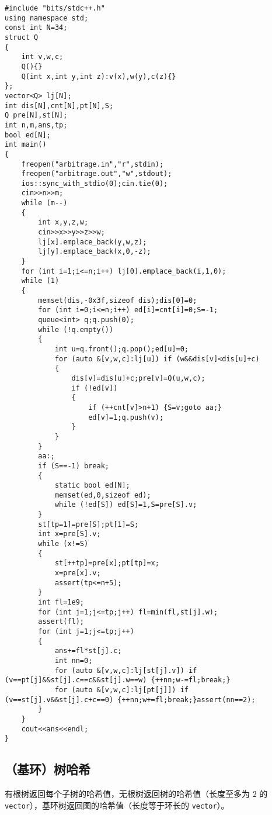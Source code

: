 \documentclass[12pt]{ctexart}
\begin{document}
\begin{lstlisting}
#include "bits/stdc++.h"
using namespace std;
const int N=34;
struct Q
{
	int v,w,c;
	Q(){}
	Q(int x,int y,int z):v(x),w(y),c(z){}
};
vector<Q> lj[N];
int dis[N],cnt[N],pt[N],S;
Q pre[N],st[N];
int n,m,ans,tp;
bool ed[N];
int main()
{
	freopen("arbitrage.in","r",stdin);
	freopen("arbitrage.out","w",stdout);
	ios::sync_with_stdio(0);cin.tie(0);
	cin>>n>>m;
	while (m--)
	{
		int x,y,z,w;
		cin>>x>>y>>z>>w;
		lj[x].emplace_back(y,w,z);
		lj[y].emplace_back(x,0,-z);
	}
	for (int i=1;i<=n;i++) lj[0].emplace_back(i,1,0);
	while (1)
	{
		memset(dis,-0x3f,sizeof dis);dis[0]=0;
		for (int i=0;i<=n;i++) ed[i]=cnt[i]=0;S=-1;
		queue<int> q;q.push(0);
		while (!q.empty())
		{
			int u=q.front();q.pop();ed[u]=0;
			for (auto &[v,w,c]:lj[u]) if (w&&dis[v]<dis[u]+c)
			{
				dis[v]=dis[u]+c;pre[v]=Q(u,w,c);
				if (!ed[v])
				{
					if (++cnt[v]>n+1) {S=v;goto aa;}
					ed[v]=1;q.push(v);
				}
			}
		}
		aa:;
		if (S==-1) break;
		{
			static bool ed[N];
			memset(ed,0,sizeof ed);
			while (!ed[S]) ed[S]=1,S=pre[S].v;
		}
		st[tp=1]=pre[S];pt[1]=S;
		int x=pre[S].v;
		while (x!=S)
		{
			st[++tp]=pre[x];pt[tp]=x;
			x=pre[x].v;
			assert(tp<=n+5);
		}
		int fl=1e9;
		for (int j=1;j<=tp;j++) fl=min(fl,st[j].w);
		assert(fl);
		for (int j=1;j<=tp;j++)
		{
			ans+=fl*st[j].c;
			int nn=0;
			for (auto &[v,w,c]:lj[st[j].v]) if (v==pt[j]&&st[j].c==c&&st[j].w==w) {++nn;w-=fl;break;}
			for (auto &[v,w,c]:lj[pt[j]]) if (v==st[j].v&&st[j].c+c==0) {++nn;w+=fl;break;}assert(nn==2);
		}
	}
	cout<<ans<<endl;
}
\end{lstlisting}

\subsection{（基环）树哈希}

有根树返回每个子树的哈希值，无根树返回树的哈希值（长度至多为 $2$ 的 \verb|vector|），基环树返回图的哈希值（长度等于环长的 \verb|vector|）。
\end{document}
